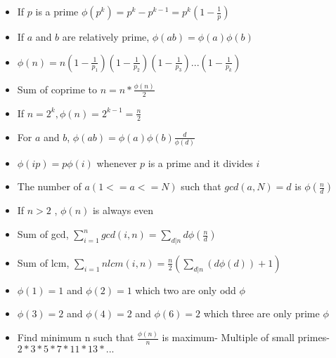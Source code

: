 {\begin{itemize}[leftmargin=*, noitemsep]
  \item If $ p $ is a prime $ \phi(p^k) = p^k - p^{k-1} = p^{k}(1 - \frac{1}{p})$
  \item If $ a $ and $ b $ are relatively prime, $ \phi(ab) = \phi(a)\phi(b) $
  \item $ \phi(n) = n(1-\frac{1}{p_1})(1-\frac{1}{p_2})(1-\frac{1}{p_3})...(1-\frac{1}{p_k}) $
  \item Sum of coprime to $ n = n * \frac{\phi(n)}{2} $
  \item If $ n = 2^k, \phi(n) = 2^{k - 1} = \frac{n}{2} $
  \item For $ a $ and $ b $, $ \phi(ab) = \phi(a)\phi(b)\frac{d}{\phi(d)} $
  \item $ \phi (ip) = p \phi(i) $ whenever $ p $ is a prime and it divides $ i $
  \item The number of $ a (1<= a <=N) $ such that $ gcd(a, N)=d $ is $ \phi(\frac{n}{d}) $
  \item If $ n > 2 $ , $ \phi(n) $ is always even
  \item Sum of gcd, $ \sum_{i=1}^n gcd(i, n) = \sum_{d|n} d \phi(\frac{n}{d}) $
  \item Sum of lcm, $ \sum_{i=1}{n}lcm(i, n) = \frac{n}{2}(\sum_{d|n}(d \phi(d))+1) $
  \item $ \phi(1) = 1 $ and $ \phi(2) = 1 $ which two are only odd $ \phi $
  \item $ \phi(3) = 2 $ and $ \phi(4) = 2 $ and $ \phi(6) = 2 $ which three are only prime $ \phi $
  \item Find minimum n such that $ \frac{\phi(n)} {n} $ is  maximum- Multiple of small primes- $ 2 * 3 * 5 * 7 * 11 * 13 * ... $
\end{itemize}

}

